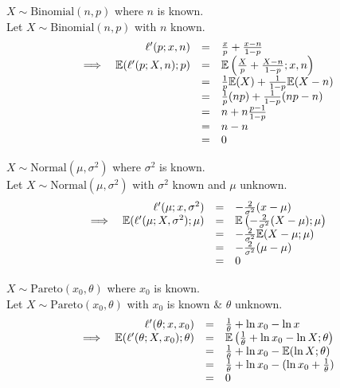 \documentclass[11pt,a4paper]{article}
\begin{document}
\qpartt
$X\sim\text{Binomial}(n,p)$ where $n$ is known.\\

\apart
Let $X\sim\text{Binomial}(n,p)$ with $n$ known.\\
\[\begin{array}{rrrl}
&\ell'(p;x,n)&=&\frac{x}{p}+\frac{x-n}{1-p}\\
\implies&\mathbb{E}(\ell'(p;X,n);p)&=&\mathbb{E}\left(\frac{X}{p}+\frac{X-n}{1-p};x,n\right)\\
&&=&\frac{1}{p}\mathbb{E}(X)+\frac{1}{1-p}\mathbb{E}(X-n)\\
&&=&\frac{1}{p}(np)+\frac{1}{1-p}(np-n)\\
&&=&n+n\frac{p-1}{1-p}\\
&&=&n-n\\
&&=&0
\end{array}\]

\qpartt
$X\sim\text{Normal}(\mu,\sigma^2)$ where $\sigma^2$ is known.\\

\apart
Let $X\sim\text{Normal}(\mu,\sigma^2)$ with $\sigma^2$ known and $\mu$ unknown.\\
\[\begin{array}{rrrl}
&\ell'(\mu;x,\sigma^2)&=&-\frac{2}{\sigma^2}(x-\mu)\\
\implies&\mathbb{E}(\ell'(\mu;X,\sigma^2);\mu)&=&\mathbb{E}\left(-\frac{2}{\sigma^2}(X-\mu);\mu\right)\\
&&=&-\frac{2}{\sigma^2}\mathbb{E}(X-\mu;\mu)\\
&&=&-\frac{2}{\sigma^2}(\mu-\mu)\\
&&=&0
\end{array}\]

\qpartt
$X\sim\text{Pareto}(x_0,\theta)$ where $x_0$ is known.\\

\apart
Let $X\sim\text{Pareto}(x_0,\theta)$ with $x_0$ is known \& $\theta$ unknown.\\
\[\begin{array}{rrrl}
&\ell'(\theta;x,x_0)&=&\frac{1}{\theta}+\ln x_0-\ln x\\
\implies&\mathbb{E}(\ell'(\theta;X,x_0);\theta)&=&\mathbb{E}\left(\frac{1}{\theta}+\ln x_0-\ln X;\theta\right)\\
&&=&\frac{1}{\theta}+\ln x_0-\mathbb{E}(\ln X;\theta)\\
&&=&\frac{1}{\theta}+\ln x_0-(\ln x_0+\frac{1}{\theta})\\
&&=&0
\end{array}\]
\end{document}
